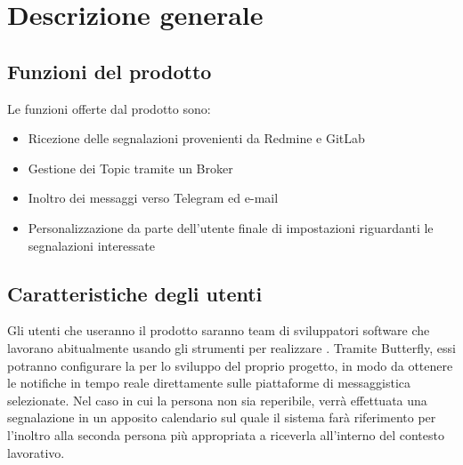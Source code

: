 \newpage
\section{Descrizione generale}

	
	\subsection{Funzioni del prodotto}
	
    Le funzioni offerte dal prodotto sono:
    \begin{itemize}
        \item Ricezione delle segnalazioni provenienti da Redmine e GitLab
        \item Gestione dei Topic tramite un Broker
        \item Inoltro dei messaggi verso Telegram ed e-mail
        \item Personalizzazione da parte dell'utente finale di impostazioni riguardanti le segnalazioni interessate
	\end{itemize}

	\subsection{Caratteristiche degli utenti}
    
    Gli utenti che useranno il prodotto saranno team di sviluppatori software che lavorano abitualmente usando gli strumenti per realizzare .
    Tramite Butterfly, essi potranno configurare la  per lo sviluppo del proprio progetto, in modo da ottenere le notifiche in tempo reale direttamente sulle piattaforme di messaggistica selezionate.
    Nel caso in cui la persona non sia reperibile, verrà effettuata una segnalazione in un apposito calendario sul quale il sistema farà riferimento per l'inoltro alla seconda persona più appropriata a riceverla all'interno del contesto lavorativo.
	
